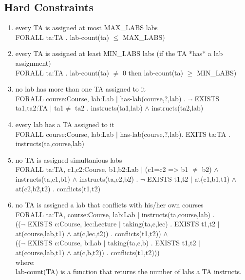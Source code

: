 \documentclass{article}
\begin{document}
\pagebreak
\begin{appendices}

  \section*{Hard Constraints}

  \begin{enumerate}
    
  \item every TA is assigned at most MAX\_LABS labs\\ FORALL ta:TA .
    lab-count(ta) $\leq$ MAX\_LABS)\\

  \item every TA is assigned at least MIN\_LABS labs (if the TA *has* a
    lab assignment)\\ FORALL ta:TA . lab-count(ta) $\not=$ 0 then
    lab-count(ta) $\geq$ MIN\_LABS)\\

  \item  no lab has more than one TA assigned to it\\ FORALL
    course:Course, lab:Lab $|$ has-lab(course,?,lab) . $\lnot$ EXISTS
    ta1,ta2:TA $|$ ta1$\not=$ ta2 . instructs(ta1,lab) $\land$
    instructs(ta2,lab)\\

  \item every lab has a TA assigned to it\\ FORALL course:Course, lab:Lab
    $|$ has-lab(course,?,lab). EXITS ta:TA . instructs(ta,course,lab)\\

  \item no TA is assigned simultanious labs\\ FORALL ta:TA, c1,c2:Course,
    b1,b2:Lab $|$ (c1=c2 => b1 $\not=$ b2) $\land$ instructs(ta,c1,b1)
    $\land$ instructs(ta,c2,b2) . $\lnot$ EXISTS t1,t2 $|$ at(c1,b1,t1)
    $\land$ at(c2,b2,t2) . conflicts(t1,t2)\\

  \item no TA is assigned a lab that conflicts with his/her own
    courses\\ FORALL ta:TA, course:Course, lab:Lab $|$
    instructs(ta,course,lab) .\\ (($\lnot$ EXISTS c:Course, lec:Lecture
    $|$ taking(ta,c,lec) . EXISTS t1,t2 $|$ at(course,lab,t1) $\land$
    at(c,lec,t2)) . conflicts(t1,t2)) $\land$\\ (($\lnot$ EXISTS
    c:Course, b:Lab $|$ taking(ta,c,b) . EXISTS t1,t2 $|$
    at(course,lab,t1) $\land$ at(c,b,t2)) . conflicts(t1,t2)))\\

    where:\\ lab-count(TA) is a function that returns the number of labs
    a TA instructs.\\

  \end{enumerate}

\end{appendices}
\end{document}
